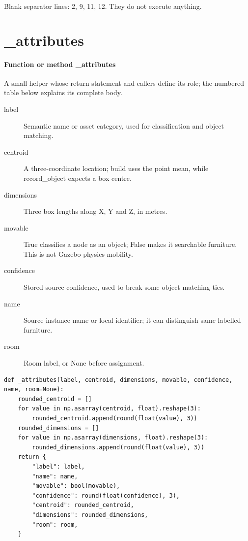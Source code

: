 \documentclass[11pt,a4paper]{book}
\begin{document}
Blank separator lines: 2, 9, 11, 12. They do not execute anything.

\section{\_attributes}

\paragraph{Function or method \_attributes}
A small helper whose return statement and callers define its role; the numbered table below explains its complete body.

\begin{description}
\item[label] Semantic name or asset category, used for classification and object matching.
\item[centroid] A three-coordinate location; build uses the point mean, while record\_object expects a box centre.
\item[dimensions] Three box lengths along X, Y and Z, in metres.
\item[movable] True classifies a node as an object; False makes it searchable furniture. This is not Gazebo physics mobility.
\item[confidence] Stored source confidence, used to break some object-matching ties.
\item[name] Source instance name or local identifier; it can distinguish same-labelled furniture.
\item[room] Room label, or None before assignment.
\end{description}

\begin{lstlisting}[firstnumber=13]
def _attributes(label, centroid, dimensions, movable, confidence, name, room=None):
    rounded_centroid = []
    for value in np.asarray(centroid, float).reshape(3):
        rounded_centroid.append(round(float(value), 3))
    rounded_dimensions = []
    for value in np.asarray(dimensions, float).reshape(3):
        rounded_dimensions.append(round(float(value), 3))
    return {
        "label": label,
        "name": name,
        "movable": bool(movable),
        "confidence": round(float(confidence), 3),
        "centroid": rounded_centroid,
        "dimensions": rounded_dimensions,
        "room": room,
    }


\end{lstlisting}
\end{document}
